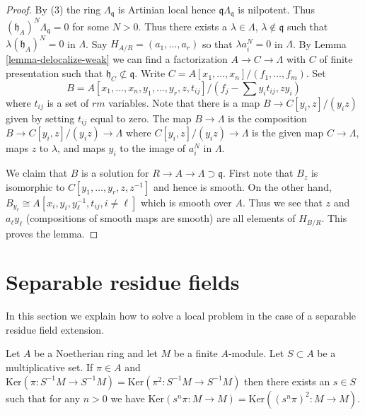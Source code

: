 \begin{proof}
By (3) the ring $\Lambda_\mathfrak q$ is Artinian local hence
$\mathfrak q\Lambda_\mathfrak q$ is nilpotent. Thus
$(\mathfrak h_A)^N \Lambda_\mathfrak q = 0$ for some $N > 0$.
Thus there exists a $\lambda \in \Lambda$, $\lambda \not \in \mathfrak q$
such that $\lambda (\mathfrak h_A)^N = 0$ in $\Lambda$.
Say $H_{A/R} = (a_1, \ldots, a_r)$ so that $\lambda a_i^N = 0$
in $\Lambda$. By Lemma \ref{lemma-delocalize-weak} we can find a factorization
$A \to C \to \Lambda$ with $C$ of finite presentation such that
$\mathfrak h_C \not \subset \mathfrak q$.
Write $C = A[x_1, \ldots, x_n]/(f_1, \ldots, f_m)$.
Set
$$
B = A[x_1, \ldots, x_n, y_1, \ldots, y_r, z, t_{ij}]/
(f_j - \sum y_i t_{ij}, zy_i)
$$
where $t_{ij}$ is a set of $rm$ variables.
Note that there is a map $B \to C[y_i, z]/(y_iz)$ given by setting $t_{ij}$
equal to zero. The map $B \to \Lambda$ is the composition
$B \to C[y_i, z]/(y_iz) \to \Lambda$ where $C[y_i, z]/(y_iz) \to \Lambda$
is the given map $C \to \Lambda$, maps $z$ to $\lambda$, and maps
$y_i$ to the image of $a_i^N$ in $\Lambda$.

\medskip\noindent
We claim that $B$ is a solution for $R \to A \to \Lambda \supset \mathfrak q$.
First note that $B_z$ is isomorphic to $C[y_1, \ldots, y_r, z, z^{-1}]$
and hence is smooth. On the other hand,
$B_{y_\ell} \cong A[x_i, y_i, y_\ell^{-1}, t_{ij}, i \not = \ell]$
which is smooth over $A$. Thus we see that $z$ and $a_\ell y_\ell$
(compositions of smooth maps are smooth) are all
elements of $H_{B/R}$. This proves the lemma.
\end{proof}




\section{Separable residue fields}
\label{section-separable}

\noindent
In this section we explain how to solve a local problem in the case
of a separable residue field extension.

\begin{lemma}[Ogoma]
\label{lemma-ogoma}
Let $A$ be a Noetherian ring and let $M$ be a finite $A$-module.
Let $S \subset A$ be a multiplicative set. If $\pi \in A$ and
$\text{Ker}(\pi : S^{-1}M \to S^{-1}M) =
\text{Ker}(\pi^2 : S^{-1}M \to S^{-1}M)$
then there exists an $s \in S$ such that for any $n > 0$ we have
$\text{Ker}(s^n\pi : M \to M) = \text{Ker}((s^n\pi)^2 : M \to M)$.
\end{lemma}


